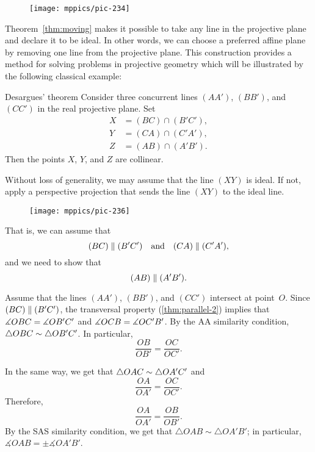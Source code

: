 {

\begin{wrapfigure}{r}{37mm}
\vskip0mm
\centering
\texttt{[image: mppics/pic-234]}
\end{wrapfigure}

Theorem~\ref{thm:moving} makes it possible to take any line in the projective plane and declare it to be ideal.
In other words, we can choose a preferred affine plane by removing one line from the projective plane.
This construction provides a method for solving problems in projective geometry 
which will be illustrated by the following classical example:


\begin{thm}{Desargues' theorem}\label{thm:desargues}
Consider three concurrent lines $(AA')$, $(BB')$, and $(CC')$ in the real projective plane.
Set
\begin{align*}
X&=(BC)\cap (B'C'),\\
Y&=(CA)\cap (C'A'),\\
Z&=(AB)\cap (A'B').
\end{align*}
Then the points $X$, $Y$, and $Z$ are collinear.
\end{thm}

}

Without loss of generality, we may assume that the line $(XY)$ is ideal.
If not, apply a perspective projection that sends the line $(XY)$ to the ideal line.

\begin{wrapfigure}{o}{40mm}
\vskip-8mm
\centering
\texttt{[image: mppics/pic-236]}
\end{wrapfigure}

That is, we can assume that 
\[(BC)\z\parallel (B'C')\quad\text{and}\quad(CA)\z\parallel (C'A'),\]
and we need to show that 
\[(AB)\z\parallel(A'B').\]

Assume that the lines $(AA')$, $(BB')$, and $(CC')$ intersect at point~$O$.
Since $(BC)\z\parallel (B'C')$, 
the transversal property (\ref{thm:parallel-2}) implies that $\measuredangle OBC\z= \measuredangle OB'C'$ and $\measuredangle OCB\z= \measuredangle OC'B'$.
By the AA similarity condition, $\triangle OBC\z\sim\triangle OB'C'$.
In particular,
\[\frac{OB}{OB'}=\frac{OC}{OC'}.\]

In the same way, we get that $\triangle OAC\z\sim\triangle OA'C'$ and
\[\frac{OA}{OA'}=\frac{OC}{OC'}.\]
Therefore, 
\[\frac{OA}{OA'}=\frac{OB}{OB'}.\]
By the SAS similarity condition, 
we get that $\triangle OAB\sim\triangle OA'B'$;
in particular, $\measuredangle OAB=\pm\measuredangle OA'B'$.

